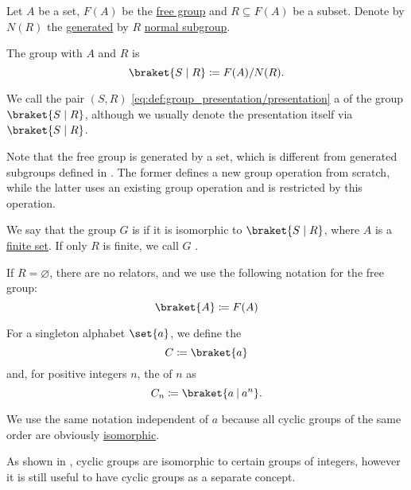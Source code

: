 \begin{definition}\label{def:group_presentation}
  Let \( A \) be a set, \( F(A) \) be the \hyperref[def:free_group]{free group} and \( R \subseteq F(A) \) be a subset. Denote by \( N(R) \) the \hyperref[def:group/submodel]{generated} by \( R \) \hyperref[def:normal_subgroup]{normal subgroup}.

  The group with  \( A \) and  \( R \) is
  \begin{equation}\label{eq:def:group_presentation/presentation}
    \braket{ S \mid R } \coloneqq F(A) / N(R).
  \end{equation}

  We call the pair \( (S, R) \) \eqref{eq:def:group_presentation/presentation} a  of the group \( \braket{ S \mid R } \), although we usually denote the presentation itself via \( \braket{ S \mid R } \).

  Note that the free group is generated by a set, which is different from generated subgroups defined in . The former defines a new group operation from scratch, while the latter uses an existing group operation and is restricted by this operation.

  We say that the group \( G \) is  if it is isomorphic to \( \braket{ S \mid R } \), where \( A \) is a \hyperref[def:set_finiteness]{finite set}. If only \( R \) is finite, we call \( G \) .

  If \( R = \varnothing \), there are no relators, and we use the following notation for the free group:
  \begin{equation}\label{eq:def:group_presentation/free}
    \braket{ A } \coloneqq F(A)
  \end{equation}
\end{definition}

\begin{definition}\label{def:cyclic_group}
  For a singleton alphabet \( \set{ a } \), we define the 
  \begin{equation*}
    C \coloneqq \braket{a}
  \end{equation*}
  and, for positive integers \( n \), the  of  \( n \) as
  \begin{equation*}
    C_n \coloneqq \braket{a \given a^n}.
  \end{equation*}

  We use the same notation independent of \( a \) because all cyclic groups of the same order are obviously \hyperref[def:group/homomorphism]{isomorphic}.

  As shown in , cyclic groups are isomorphic to certain groups of integers, however it is still useful to have cyclic groups as a separate concept.
\end{definition}

